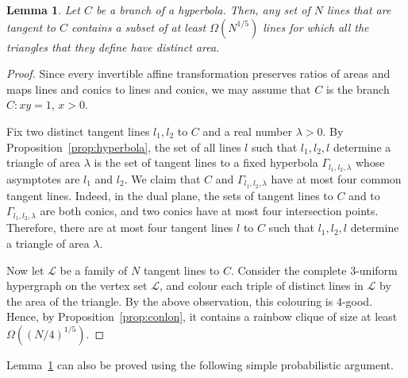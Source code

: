 \documentclass[a4paper,oneside,10pt]{amsart}
\newtheorem{lem}{Lemma}
\begin{document}
\begin{lem} \label{lem:triangles by a branch}
Let $C$ be a branch of a hyperbola.
Then, any set of $N$ lines that are tangent to $C$ contains a subset of at least $\Omega (N^{1/5})$ lines for which all the triangles that they define have distinct area.
\end{lem}


\begin{proof}
Since every invertible affine transformation preserves ratios of areas and maps lines and conics to lines and conics, we may assume that $C$ is the branch
$C\colon xy=1$, $x>0$.

Fix two distinct tangent lines $l_1,l_2$ to $C$ and a real number $\lambda>0$. By Proposition~\ref{prop:hyperbola}, the set of all lines $l$ such that $l_1,l_2,l$ determine a triangle of area $\lambda$ is the set of tangent lines to a fixed hyperbola $\Gamma_{l_1,l_2,\lambda}$ whose asymptotes are $l_1$ and $l_2$.
We claim that $C$ and $\Gamma_{l_1,l_2,\lambda}$ have at most four common tangent lines. Indeed, in the dual plane, the sets of tangent lines to $C$ and to $\Gamma_{l_1,l_2,\lambda}$ are both conics, and two conics have at most four intersection points. Therefore, there are at most four tangent lines $l$ to $C$ such that $l_1,l_2,l$ determine a triangle of area $\lambda$.

Now let $\mathcal{L}$ be a family of $N$ tangent lines to $C$. Consider the complete $3$-uniform hypergraph on the vertex set $\mathcal{L}$, and colour each triple of distinct lines in $\mathcal{L}$ by the area of the triangle. By the above observation, this colouring is $4$-good. Hence, by Proposition~\ref{prop:conlon}, it contains a rainbow clique of size at least $\Omega((N/4)^{1/5})$.

\end{proof}


Lemma~\ref{lem:triangles by a branch} can also be proved using the following simple probabilistic argument.
\end{document}
